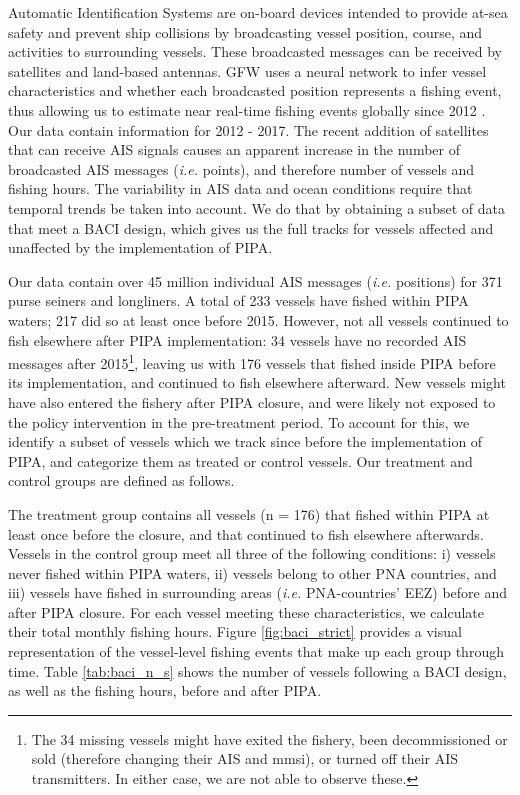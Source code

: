 \documentclass[11pt,]{article}
\let\rmarkdownfootnote\footnote%
\def\footnote{\protect\rmarkdownfootnote}
\begin{document}
Automatic Identification Systems are on-board devices intended to
provide at-sea safety and prevent ship collisions by broadcasting vessel
position, course, and activities to surrounding vessels. These
broadcasted messages can be received by satellites and land-based
antennas. GFW uses a neural network to infer vessel characteristics and
whether each broadcasted position represents a fishing event, thus
allowing us to estimate near real-time fishing events globally since
2012 \citep{kroodsma_2018}. Our data contain information for 2012 -
2017. The recent addition of satellites that can receive AIS signals
causes an apparent increase in the number of broadcasted AIS messages
(\emph{i.e.} points), and therefore number of vessels and fishing hours.
The variability in AIS data and ocean conditions require that temporal
trends be taken into account. We do that by obtaining a subset of data
that meet a BACI design, which gives us the full tracks for vessels
affected and unaffected by the implementation of PIPA.

Our data contain over 45 million individual AIS messages (\emph{i.e.}
positions) for 371 purse seiners and longliners. A total of 233 vessels
have fished within PIPA waters; 217 did so at least once before 2015.
However, not all vessels continued to fish elsewhere after PIPA
implementation: 34 vessels have no recorded AIS messages after
2015\footnote{The 34 missing vessels might have exited the fishery, been
  decommissioned or sold (therefore changing their AIS and mmsi), or
  turned off their AIS transmitters. In either case, we are not able to
  observe these.}, leaving us with 176 vessels that fished inside PIPA
before its implementation, and continued to fish elsewhere afterward.
New vessels might have also entered the fishery after PIPA closure, and
were likely not exposed to the policy intervention in the pre-treatment
period. To account for this, we identify a subset of vessels which we
track since before the implementation of PIPA, and categorize them as
treated or control vessels. Our treatment and control groups are defined
as follows.

The treatment group contains all vessels (n = 176) that fished within
PIPA at least once before the closure, and that continued to fish
elsewhere afterwards. Vessels in the control group meet all three of the
following conditions: i) vessels never fished within PIPA waters, ii)
vessels belong to other PNA countries, and iii) vessels have fished in
surrounding areas (\emph{i.e.} PNA-countries' EEZ) before and after PIPA
closure. For each vessel meeting these characteristics, we calculate
their total monthly fishing hours. Figure \ref{fig:baci_strict} provides
a visual representation of the vessel-level fishing events that make up
each group through time. Table \ref{tab:baci_n_s} shows the number of
vessels following a BACI design, as well as the fishing hours, before
and after PIPA.
\end{document}
